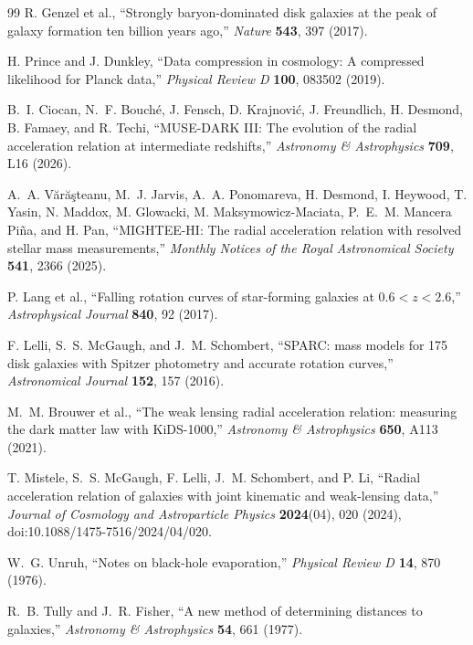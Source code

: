 \documentclass[11pt]{article}
\begin{document}
\begin{thebibliography}{99}
R. Genzel et al.,
``Strongly baryon-dominated disk galaxies at the peak of galaxy formation ten billion years ago,''
\emph{Nature} \textbf{543}, 397 (2017).

H. Prince and J. Dunkley,
``Data compression in cosmology: A compressed likelihood for Planck data,''
\emph{Physical Review D} \textbf{100}, 083502 (2019).

B.~I. Ciocan, N.~F. Bouch\'e, J. Fensch, D. Krajnovi\'c, J. Freundlich, H. Desmond, B. Famaey, and R. Techi,
``MUSE-DARK III: The evolution of the radial acceleration relation at intermediate redshifts,''
\emph{Astronomy \& Astrophysics} \textbf{709}, L16 (2026).

A.~A. V\u{a}r\u{a}\c{s}teanu, M.~J. Jarvis, A.~A. Ponomareva, H. Desmond, I. Heywood, T. Yasin, N. Maddox, M. Glowacki, M. Maksymowicz-Maciata, P.~E.~M. Mancera Pi\~na, and H. Pan,
``MIGHTEE-HI: The radial acceleration relation with resolved stellar mass measurements,''
\emph{Monthly Notices of the Royal Astronomical Society} \textbf{541}, 2366 (2025).

P. Lang et al.,
``Falling rotation curves of star-forming galaxies at $0.6<z<2.6$,''
\emph{Astrophysical Journal} \textbf{840}, 92 (2017).

F. Lelli, S.~S. McGaugh, and J.~M. Schombert,
``SPARC: mass models for 175 disk galaxies with Spitzer photometry and accurate rotation curves,''
\emph{Astronomical Journal} \textbf{152}, 157 (2016).

M.~M. Brouwer et al.,
``The weak lensing radial acceleration relation: measuring the dark matter law with KiDS-1000,''
\emph{Astronomy \& Astrophysics} \textbf{650}, A113 (2021).

T. Mistele, S.~S. McGaugh, F. Lelli, J.~M. Schombert, and P. Li,
``Radial acceleration relation of galaxies with joint kinematic and weak-lensing data,''
\emph{Journal of Cosmology and Astroparticle Physics} \textbf{2024}(04), 020 (2024),
doi:10.1088/1475-7516/2024/04/020.

W.~G. Unruh,
``Notes on black-hole evaporation,''
\emph{Physical Review D} \textbf{14}, 870 (1976).

R.~B. Tully and J.~R. Fisher,
``A new method of determining distances to galaxies,''
\emph{Astronomy \& Astrophysics} \textbf{54}, 661 (1977).


\end{thebibliography}
\end{document}
